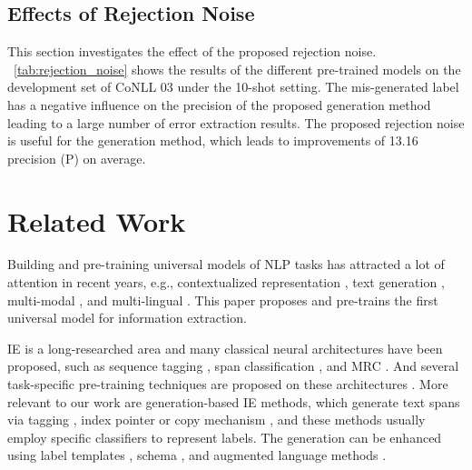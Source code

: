 \documentclass[11pt]{article}
\begin{document}
\subsection{Effects of Rejection Noise}

This section investigates the effect of the proposed rejection noise.
\tablename~\ref{tab:rejection_noise} shows the results of the different pre-trained models on the development set of CoNLL 03 under the 10-shot setting.
The mis-generated label has a negative influence on the precision of the proposed generation method leading to a large number of error extraction results.
The proposed rejection noise is useful for the generation method, which leads to improvements of 13.16 precision (P) on average.
 
\section{Related Work} \label{section:related_work}
Building and pre-training universal models of NLP tasks has attracted a lot of attention in recent years, e.g., contextualized representation \citep{devlin-etal-2019-bert, roberta}, text generation \citep{lewis-etal-2020-bart,2020t5}, multi-modal \citep{li-etal-2021-unimo,pmlr-v139-cho21a}, and multi-lingual \citep{conneau-etal-2020-unsupervised,xue-etal-2021-mt5}.
This paper proposes and pre-trains the first universal model for information extraction.

IE is a long-researched area and many classical neural architectures have been proposed, such as sequence tagging \citep{lample-etal-2016-neural,zheng-etal-2017-joint,lin-etal-2019-sequence}, span classification \citep{sohrab-miwa-2018-deep,lin-etal-2018-nugget,wadden-etal-2019-entity}, and MRC \citep{levy-etal-2017-zero,li-etal-2020-unified,du-cardie-2020-event}.
And several task-specific pre-training techniques are proposed on these architectures \citep{mengge-etal-2020-coarse,wang-etal-2021-cleve, qin-etal-2021-erica}.
More relevant to our work are generation-based IE methods, which generate text spans via tagging \citep{strakova-etal-2019-neural,ma-etal-2019-exploring}, index pointer \citep{ren-etal-2021-hyspa,yan-etal-2021-unified-generative} or copy mechanism \citep{zeng-etal-2018-extracting}, and these methods usually employ specific classifiers to represent labels.
The generation can be enhanced using label templates \citep{li-etal-2021-document,liu-etal-2021-fine,cui-etal-2021-template}, schema \citep{lu-etal-2021-text2event,ahmad-etal-2021-intent}, and augmented language methods \citep{paolini2021structured}.
\end{document}
